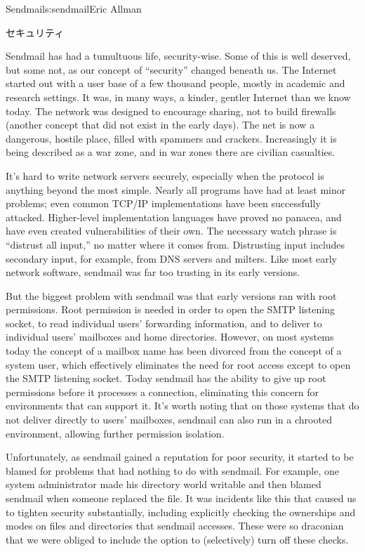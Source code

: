 \begin{aosachapter}{Sendmail}{s:sendmail}{Eric Allman}
\begin{aosasect1}{セキュリティ}

Sendmail has had a tumultuous life, security-wise. Some of this is
well deserved, but some not, as our concept of ``security'' changed
beneath us. The Internet started out with a user base of a few
thousand people, mostly in academic and research settings. It was, in
many ways, a kinder, gentler Internet than we know today. The network
was designed to encourage sharing, not to build firewalls (another
concept that did not exist in the early days). The net is now a
dangerous, hostile place, filled with spammers and crackers.
Increasingly it is being described as a war zone, and in war zones
there are civilian casualties.

It's hard to write network servers securely, especially when the
protocol is anything beyond the most simple. Nearly all programs have
had at least minor problems; even common TCP/IP implementations have
been successfully attacked. Higher-level implementation languages have
proved no panacea, and have even created vulnerabilities of their
own. The necessary watch phrase is ``distrust all input,'' no matter
where it comes from. Distrusting input includes secondary input, for
example, from DNS servers and milters. Like most early network
software, sendmail was far too trusting in its early versions.

But the biggest problem with sendmail was that early versions ran with
root permissions. Root permission is needed in order to open the SMTP
listening socket, to read individual users' forwarding information,
and to deliver to individual users' mailboxes and home
directories. However, on most systems today the concept of a mailbox
name has been divorced from the concept of a system user, which
effectively eliminates the need for root access except to open the
SMTP listening socket. Today sendmail has the ability to give up root
permissions before it processes a connection, eliminating this concern
for environments that can support it. It's worth noting that on those
systems that do not deliver directly to users' mailboxes, sendmail can
also run in a chrooted environment, allowing further permission
isolation.

Unfortunately, as sendmail gained a reputation for poor security, it
started to be blamed for problems that had nothing to do with
sendmail.  For example, one system administrator made his 
directory world writable and then blamed sendmail when someone
replaced the  file. It was incidents like this that
caused us to tighten security substantially, including explicitly
checking the ownerships and modes on files and directories that
sendmail accesses. These were so draconian that we were obliged to
include the  option to (selectively) turn off
these checks.


\end{aosasect1}
\end{aosachapter}
